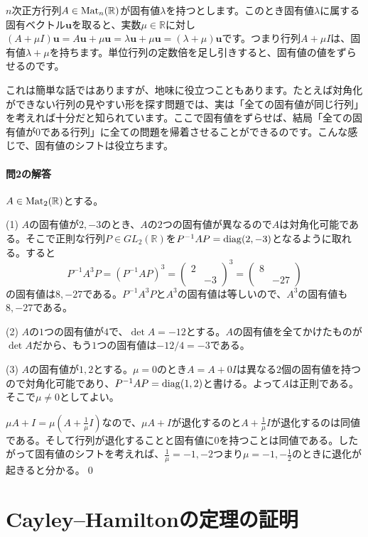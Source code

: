 $n$次正方行列$A \in \operatorname{Mat}_n(\mathbb{R})$が固有値$\lambda$を持つとします。このとき固有値$\lambda$に属する固有ベクトル$\bm{u}$を取ると、実数$\mu \in \mathbb{R}$に対し$(A + \mu I)\bm{u} = A\bm{u} + \mu \bm{u} = \lambda \bm{u} + \mu \bm{u} = (\lambda + \mu) \bm{u}$です。つまり行列$A + \mu I$は、固有値$\lambda + \mu$を持ちます。単位行列の定数倍を足し引きすると、固有値の値をずらせるのです。

これは簡単な話ではありますが、地味に役立つこともあります。たとえば対角化ができない行列の見やすい形を探す問題では、実は「全ての固有値が同じ行列」を考えれば十分だと知られています。ここで固有値をずらせば、結局「全ての固有値が$0$である行列」に全ての問題を帰着させることができるのです。こんな感じで、固有値のシフトは役立ちます。

\paragraph{問2の解答} $A \in \operatorname{Mat}_2(\mathbb{R})$とする。

\noindent (1) $A$の固有値が$2, -3$のとき、$A$の$2$つの固有値が異なるので$A$は対角化可能である。そこで正則な行列$P \in GL_2(\mathbb{R})$を$P^{-1} A P = \operatorname{diag}(2, -3)$となるように取れる。すると
\[
P^{-1} A^3 P = (P^{-1} A P)^3 =
\begin{pmatrix}
2 \\
& -3
\end{pmatrix}^3
=
\begin{pmatrix}
8 \\
& -27
\end{pmatrix}
\]
の固有値は$8, -27$である。$P^{-1} A^3 P$と$A^3$の固有値は等しいので、$A^3$の固有値も$8, -27$である。

\noindent (2) $A$の$1$つの固有値が$4$で、$\det A = -12$とする。$A$の固有値を全てかけたものが$\det A$だから、もう$1$つの固有値は$-12/4 = -3$である。

\noindent (3) $A$の固有値が$1, 2$とする。$\mu = 0$のとき$A = A + 0I$は異なる$2$個の固有値を持つので対角化可能であり、$P^{-1} A P = \operatorname{diag}(1, 2)$と書ける。よって$A$は正則である。そこで$\mu \neq 0$としてよい。

$\mu A + I = \mu (A + \frac{1}{\mu}I)$なので、$\mu A + I$が退化するのと$A + \frac{1}{\mu}I$が退化するのは同値である。そして行列が退化することと固有値に$0$を持つことは同値である。したがって固有値のシフトを考えれば、$\frac{1}{\mu} = -1, -2$つまり$\mu = -1, -\frac{1}{2}$のときに退化が起きると分かる。\qed

\section{Cayley--Hamiltonの定理の証明}

